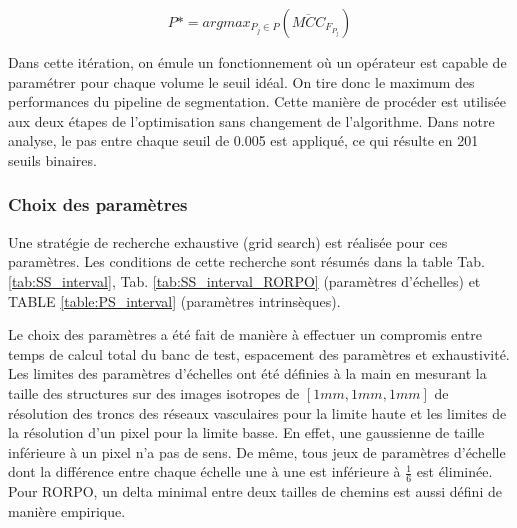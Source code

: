   \begin{equation}
    P* =  argmax_ {P_j \in P}( \overline{MCC}_{ F_{P_j} } )
  \end{equation}


  Dans cette itération, on émule un fonctionnement où un opérateur est capable de paramétrer pour chaque volume le seuil idéal. On tire donc le maximum des performances du pipeline de segmentation. Cette manière de procéder est utilisée aux deux étapes de l'optimisation sans changement de l'algorithme. Dans notre analyse, le pas entre chaque seuil de 0.005 est appliqué, ce qui résulte en 201 seuils binaires.

  \subsubsection{Choix des paramètres}

Une stratégie de recherche exhaustive (grid search) est réalisée pour ces paramètres. Les conditions de cette recherche sont résumés dans la table Tab. \ref{tab:SS_interval}, Tab. \ref{tab:SS_interval_RORPO} (paramètres d'échelles) et TABLE \ref{table:PS_interval} (paramètres intrinsèques).

Le choix des paramètres a été fait de manière à effectuer un compromis entre temps de calcul total du banc de test, espacement des paramètres et exhaustivité. Les limites des paramètres d'échelles ont été définies à la main en mesurant la taille des structures sur des images isotropes de $[1mm,1mm,1mm]$ de résolution des troncs des réseaux vasculaires pour la limite haute et les limites de la résolution d'un pixel pour la limite basse. En effet, une gaussienne de taille inférieure à un pixel n'a pas de sens. De même, tous jeux de paramètres d'échelle dont la différence entre chaque échelle une à une est inférieure à $\frac{1}{6}$ est éliminée. Pour RORPO, un delta minimal entre deux tailles de chemins est aussi défini de manière empirique.

